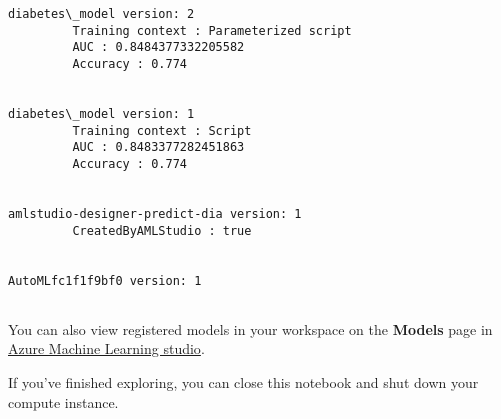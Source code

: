 \documentclass[11pt]{article}
\begin{document}
    \begin{Verbatim}[commandchars=\\\{\}]
diabetes\_model version: 2
         Training context : Parameterized script
         AUC : 0.8484377332205582
         Accuracy : 0.774


diabetes\_model version: 1
         Training context : Script
         AUC : 0.8483377282451863
         Accuracy : 0.774


amlstudio-designer-predict-dia version: 1
         CreatedByAMLStudio : true


AutoMLfc1f1f9bf0 version: 1


    \end{Verbatim}

    You can also view registered models in your workspace on the
\textbf{Models} page in \href{https://ml.azure.com}{Azure Machine
Learning studio}.

If you've finished exploring, you can close this notebook and shut down
your compute instance.


    
    
    
\end{document}
